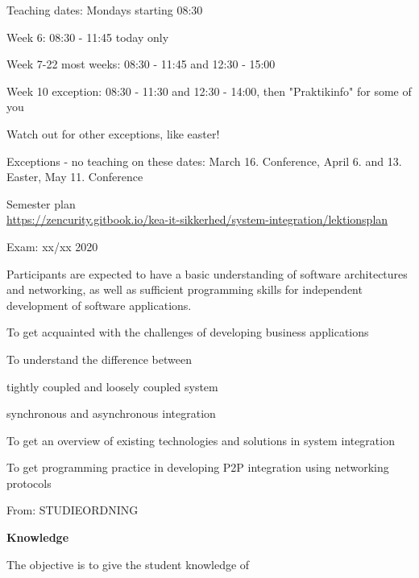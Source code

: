 \documentclass[Screen16to9,17pt]{foils}
\begin{document}
Teaching dates: Mondays starting 08:30

\begin{list2}
\item Week 6: 08:30 - 11:45 today only
\item Week 7-22 most weeks: 08:30 - 11:45 and 12:30 - 15:00
\item Week 10 exception: 08:30 - 11:30 and 12:30 - 14:00, then "Praktikinfo" for some of you
\item Watch out for other exceptions, like easter!
\item Exceptions - no teaching on these dates: March 16. Conference, April 6. and 13. Easter, May 11. Conference
\end{list2}

Semester plan\\
\url{https://zencurity.gitbook.io/kea-it-sikkerhed/system-integration/lektionsplan}

Exam: xx/xx 2020




Participants are expected to have a basic understanding of software architectures and networking, as well as sufficient
programming skills for independent development of software applications.




\begin{list1}
\item To get acquainted with the challenges of developing business applications
\item To understand the difference between
\begin{list2}
\item tightly coupled and loosely coupled system
\item synchronous and asynchronous integration
\end{list2}
\item To get an overview of existing technologies and solutions in system integration
\item To get programming practice in developing P2P integration using networking
protocols
\end{list1}


From: STUDIEORDNING

{\bf Knowledge}

The objective is to give the student knowledge of
\end{document}
